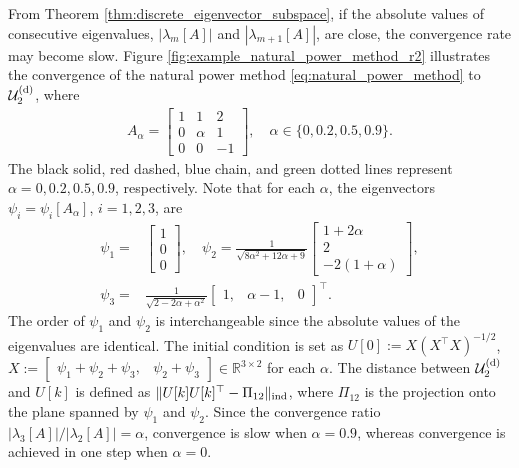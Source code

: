 \documentclass{ifacconf}
\begin{document}
From Theorem \ref{thm:discrete_eigenvector_subspace}, if the absolute values of consecutive eigenvalues, $|\lambda _{m}[A]|$ and $|\lambda _{m+1}[A]|$, are close, the convergence rate may become slow. 
Figure \ref{fig:example_natural_power_method_r2} illustrates the convergence of the natural power method \eqref{eq:natural_power_method} to $\mathcal{U}_{2}^{\rm (d)}$, where
\begin{align}
    A_{\alpha} = \begin{bmatrix}
    1 & 1 & 2
    \\
    0 & \alpha & 1
    \\
    0 & 0 & -1
    \end{bmatrix}
    ,\quad \alpha \in \{0, 0.2, 0.5, 0.9\}.
    \label{eq:A_alpha}
\end{align}
The black solid, red dashed, blue chain, and green dotted lines represent $\alpha =0, 0.2, 0.5, 0.9$, respectively.  
Note that for each $\alpha$, the eigenvectors $\psi _{i} = \psi _{i}[A_{\alpha}]$, $i=1,2,3$, are
\begin{align*}
     \psi_{1} =& \begin{bmatrix} 1 \\ 0 \\ 0 \end{bmatrix}, \quad
     \psi_{2} = \frac{1}{\sqrt{8\alpha ^{2} + 12 \alpha + 9}} \begin{bmatrix} 1+2\alpha  \\ 2 \\ -2 (1+\alpha ) \end{bmatrix} , \\
    \psi_{3} =& \frac{1}{\sqrt{2-2\alpha + \alpha^2}}\begin{bmatrix} 1, & \alpha -1 ,& 0 \end{bmatrix} ^{\top}. 
\end{align*}
The order of $\psi _{1}$ and $\psi _{2}$ is interchangeable since the absolute values of the eigenvalues are identical. 
The initial condition is set as $U[0] := X (X^{\top}X)^{-1/2}$, $X :=\begin{bmatrix} \psi _{1}+ \psi _{2} + \psi _{3}, & \psi _{2} + \psi _{3} \end{bmatrix} 
    \in \mathbb{R}^{3\times 2}$ 
for each $\alpha$.  
The distance between $\mathcal{U}_{2}^{\rm (d)}$ and $U[k]$ is defined as $\| U[k] U[k]^{\top} - \Pi _{12} \| _{\rm ind}$, where $\Pi _{12}$ is the projection onto the plane spanned by $\psi _{1}$ and $\psi _{2}$. 
Since the convergence ratio $|\lambda _{3}[A]| / |\lambda _{2}[A]| = \alpha$, convergence is slow when $\alpha =0.9$, whereas convergence is achieved in one step when $\alpha =0$.
\end{document}
